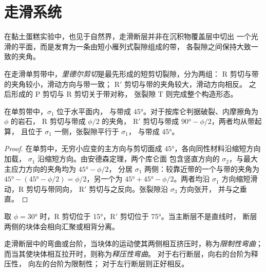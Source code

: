 \section{走滑系统}\label{sec:b3:extension-strike-slip:strike-slip}

在黏土蛋糕实验中，也见于自然界，走滑断层并非在沉积物覆盖层中切出
一个光滑的平面，而是发育为一条由短小雁列式裂隙组成的带，
各裂隙之间保持大致一致的夹角。

\begin{definition}[里德尔剪切]\label{def:b3:extension-strike-slip:riedel}
在走滑单剪带中，\emph{里德尔剪切}是最先形成的短剪切裂隙，分为两组：
R 剪切与带的夹角较小，滑动方向与带一致；
R$'$ 剪切与带的夹角较大，滑动方向相反。
之后形成的 P 剪切与 R 剪切关于带对称，
张裂隙 T 则完成整个构造形态。
\end{definition}

\begin{proposition}[里德尔角]\label{prop:b3:extension-strike-slip:riedel}
在单剪带中，$\sigma_1$ 位于水平面内，
与带成 \ang{45}。对于按库仑判据破裂、内摩擦角为 $\phi$ 的岩石，
R 剪切与带成 $\phi/2$ 的夹角，
R$'$ 剪切与带成 $\ang{90} - \phi/2$，两者均从带起算，
且位于 $\sigma_1$ 一侧，张裂隙平行于 $\sigma_1$，
与带成 \ang{45}。
\end{proposition}

\begin{proof}
在单剪中，无穷小应变的主方向与剪切面成
\ang{45}，各向同性材料沿缩短方向加载，
$\sigma_1$ 沿缩短方向。由安德森定理，两个库仑面
包含竖直方向的 $\sigma_2$，与最大主应力方向的夹角均为 $\ang{45} - \phi/2$，
分居 $\sigma_1$ 两侧：较靠近带的一个与带的夹角为 $\ang{45} -
(\ang{45} - \phi/2) = \phi/2$，另一个为 $\ang{45} + \ang{45} -
\phi/2$。两者均沿 $\sigma_1$ 方向缩短滑动，R 剪切与带同向，
R$'$ 剪切与之反向。张裂隙沿 $\sigma_3$ 方向张开，
并与之垂直。
\end{proof}

取 $\phi = \ang{30}$ 时，R 剪切位于 \ang{15}，R$'$ 剪切位于
\ang{75}。当主断层不是直线时，
断层两侧的块体会相向汇聚或相背分离。

\begin{definition}\label{def:b3:extension-strike-slip:bends}
走滑断层中的弯曲或台阶，当块体的运动使其两侧相互挤压时，称为\emph{限制性弯曲}；
而当其使块体相互拉开时，则称为\emph{释压性弯曲}。
对于右行断层，向右的台阶为释压性，
向左的台阶为限制性；
对于左行断层则正好相反。
\end{definition}

